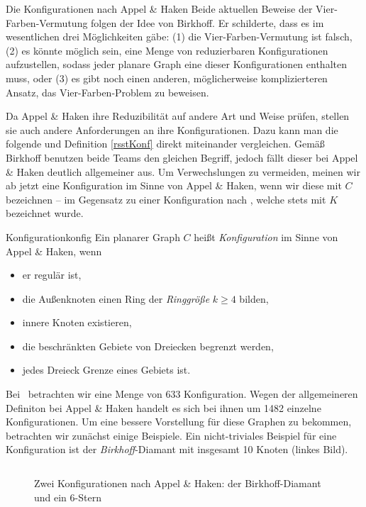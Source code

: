   \begin{section}{Die Konfigurationen nach Appel \& Haken}
  Beide aktuellen Beweise der Vier-Farben-Vermutung folgen der Idee von Birkhoff. Er schilderte, dass es im wesentlichen drei Möglichkeiten gäbe: (1) die Vier-Farben-Vermutung ist falsch, (2) es könnte möglich sein, eine Menge von reduzierbaren Konfigurationen aufzustellen, sodass jeder planare Graph eine dieser Konfigurationen enthalten muss, oder (3) es gibt noch einen anderen, möglicherweise komplizierteren Ansatz, das Vier-Farben-Problem zu beweisen. \cite{AH1}
   
   Da Appel \& Haken ihre Reduzibilität auf andere Art und Weise prüfen, stellen sie auch andere Anforderungen an ihre Konfigurationen. Dazu kann man die folgende und Definition \ref{rsstKonf} direkt miteinander vergleichen. Gemäß Birkhoff benutzen beide Teams den gleichen Begriff, jedoch fällt dieser bei Appel \& Haken deutlich allgemeiner aus. Um Verwechslungen zu vermeiden, meinen wir ab jetzt eine Konfiguration im Sinne von Appel \& Haken, wenn wir diese mit $C$ bezeichnen -- im Gegensatz zu einer Konfiguration nach \rsst, welche stets mit $K$ bezeichnet wurde.
   
   \begin{definitionl}{Konfiguration}{konfig}
    Ein planarer Graph $C$ heißt \textit{Konfiguration} im Sinne von Appel \& Haken, wenn
    \begin{itemize}
     \item er regulär ist,
     \item die Außenknoten einen Ring der \textit{Ringgröße} $k \geq 4$ bilden,
     \item innere Knoten existieren,
     \item die beschränkten Gebiete von Dreiecken begrenzt werden,
     \item jedes Dreieck Grenze eines Gebiets ist.
    \end{itemize}
   \end{definitionl}
   
   Bei \rsst\-\ betrachten wir eine Menge von 633 Konfiguration. Wegen der allgemeineren Definiton bei Appel \& Haken handelt es sich bei ihnen um 1482 einzelne Konfigurationen. Um eine bessere Vorstellung für diese Graphen zu bekommen, betrachten wir zunächst einige Beispiele. Ein nicht-triviales Beispiel für eine Konfiguration ist der \textit{Birkhoff}-Diamant mit insgesamt 10 Knoten (linkes Bild).
   
  \begin{figure}[hb]
   \label{AHkonfig}
    \[  \]
    \caption[Zwei Konfigurationen nach Appel \& Haken: der Birkhoff-Diamant und ein $6$-Stern]{Zwei Konfigurationen nach Appel \& Haken: der Birkhoff-Diamant und ein $6$-Stern}
  \end{figure}
   

\end{section}

